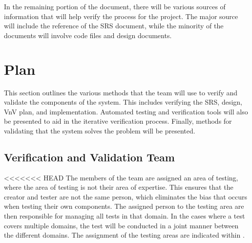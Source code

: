 \documentclass[12pt, titlepage]{article}
\begin{document}
In the remaining portion of the document, there will be various sources of information that will help verify the process for the project. The major source will include the reference of the SRS document, while the minority of the documents will involve code files and design documents.


\citet{SRS}

\section{Plan}

This section outlines the various methods that the team will use to verify and validate the components of the system. This includes verifying the SRS, design, VnV plan, and implementation. Automated testing and verification tools will also be presented to aid in the iterative verification process. Finally, methods for validating that the system solves the problem will be presented.

\subsection{Verification and Validation Team}

<<<<<<< HEAD
The members of the team are assigned an area of testing, where the area of testing is not their area of expertise. This ensures that the creator and tester are not the same person, which eliminates the bias that occurs when testing their own components. The assigned person to the testing area are then responsible for managing all tests in that domain. In the cases where a test covers multiple domains, the test will be conducted in a joint manner between the different domains. The assignment of the testing areas are indicated within .
  
\end{document}
